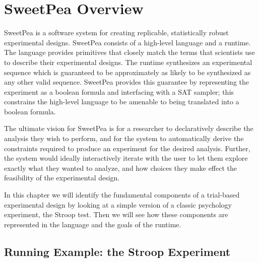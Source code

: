 
\chapter{SweetPea Overview}

SweetPea is a software system for creating replicable, statistically robust experimental designs. SweetPea consists of a high-level language and a runtime. The language provides primitives that closely match the terms that scientists use to describe their experimental designs. The runtime synthesizes an experimental sequence which is guaranteed to be approximately as likely to be synthesized as any other valid sequence. SweetPea provides this guarantee by representing the experiment as a boolean formula and interfacing with a SAT sampler; this constrains the high-level language to be amenable to being translated into a boolean formula.

The ultimate vision for SweetPea is for a researcher to declaratively describe the analysis they wish to perform, and for the system to automatically derive the constraints required to produce an experiment for the desired analysis. Further, the system would ideally interactively iterate with the user to let them explore exactly what they wanted to analyze, and how choices they make effect the feasibility of the experimental design.

In this chapter we will identify the fundamental components of a trial-based experimental design by looking at a simple version of a classic psychology experiment, the Stroop test. Then we will see how these components are represented in the language and the goals of the runtime.

\section{Running Example: the Stroop Experiment}

